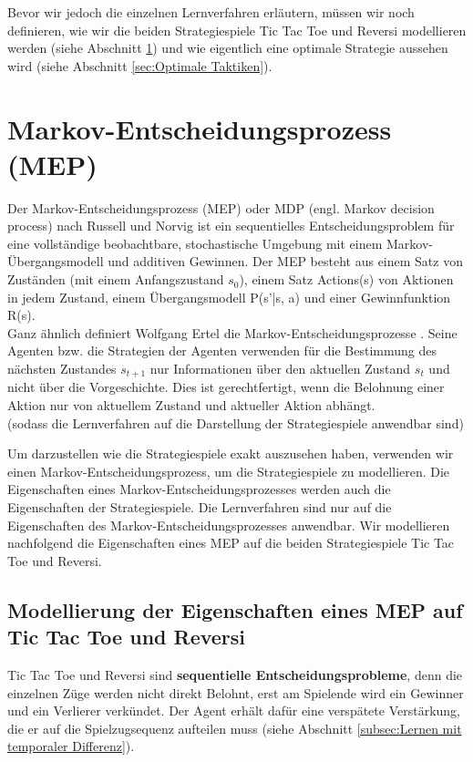 Bevor wir jedoch die einzelnen Lernverfahren erläutern, müssen wir noch definieren, wie wir die beiden Strategiespiele Tic Tac Toe und Reversi modellieren werden (siehe Abschnitt \ref{sec:Markov-Entscheidungsprozess}) und wie eigentlich eine optimale Strategie aussehen wird (siehe Abschnitt \ref{sec:Optimale Taktiken}).\\

\section{Markov-Entscheidungsprozess (MEP)}
\label{sec:Markov-Entscheidungsprozess}
Der Markov-Entscheidungsprozess (MEP) oder MDP (engl. Markov decision process) nach Russell und Norvig \cite[752 \psqq]{Russell} ist ein sequentielles Entscheidungsproblem für eine vollständige beobachtbare, stochastische Umgebung mit einem Markov-Übergangsmodell und additiven Gewinnen. Der MEP besteht aus einem Satz von Zuständen (mit einem Anfangszustand $s_0$), einem Satz Actions(s) von Aktionen in jedem Zustand, einem Übergangsmodell P(s'|s, a) und einer Gewinnfunktion R(s). \\

Ganz ähnlich definiert Wolfgang Ertel die Markov-Entscheidungsprozesse \cite[291]{Ertel}. Seine Agenten bzw. die Strategien der Agenten verwenden für die Bestimmung des nächsten Zustandes $s_{t+1}$ nur Informationen über den aktuellen Zustand $s_t$ und nicht über die Vorgeschichte. Dies ist gerechtfertigt, wenn die Belohnung einer Aktion nur von aktuellem Zustand und aktueller Aktion abhängt.\\

(sodass die Lernverfahren auf die Darstellung der Strategiespiele anwendbar sind)

Um darzustellen wie die Strategiespiele exakt auszusehen haben, verwenden wir einen Markov-Entscheidungsprozess, um die Strategiespiele zu modellieren. Die Eigenschaften eines Markov-Entscheidungsprozesses werden auch die Eigenschaften der Strategiespiele. Die Lernverfahren sind nur auf die Eigenschaften des Markov-Entscheidungsprozesses anwendbar. Wir modellieren nachfolgend die Eigenschaften eines MEP auf die beiden Strategiespiele Tic Tac Toe und Reversi. \\

\subsection{Modellierung der Eigenschaften eines MEP auf Tic Tac Toe und Reversi}
Tic Tac Toe und Reversi sind \textbf{sequentielle Entscheidungsprobleme}, denn die einzelnen Züge werden nicht direkt Belohnt, erst am Spielende wird ein Gewinner und ein Verlierer verkündet. Der Agent erhält dafür eine verspätete Verstärkung, die er auf die Spielzugsequenz aufteilen muss (siehe Abschnitt \ref{subsec:Lernen mit temporaler Differenz}).\\

